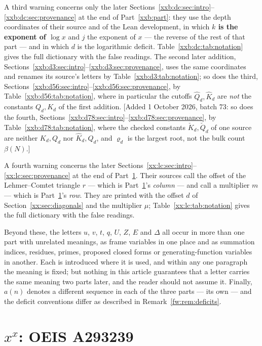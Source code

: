 \documentclass[11pt,a4paper]{article}
\numberwithin{equation}{section}
\theoremstyle{definition}
\theoremstyle{remark}
\theoremstyle{plain}
\begin{document}
\noindent
A third warning concerns only the later
Sections~\ref{xxb:dc:sec:intro}--\ref{xxb:dc:sec:provenance} at the end of
Part~\ref{xxb:part}: they use the depth coordinates of their source and of the
Lean development, in which \textbf{$k$ is the exponent of $\log x$} and $j$ the
exponent of $x$ --- the reverse of the rest of that part --- and in which $d$
is the logarithmic deficit.  Table~\ref{xxb:dc:tab:notation} gives the full
dictionary with the false readings.  The second later addition,
Sections~\ref{xxb:d3:sec:intro}--\ref{xxb:d3:sec:provenance}, uses the same
coordinates and renames its source's letters by
Table~\ref{xxb:d3:tab:notation}; so does the third,
Sections~\ref{xxb:d56:sec:intro}--\ref{xxb:d56:sec:provenance}, by
Table~\ref{xxb:d56:tab:notation}, where in particular the cutoffs
$\widehat Q_d,\widehat K_d$ are \emph{not} the constants $Q_d,K_d$ of the first
addition.  [Added 1 October 2026, batch 73: so does the fourth,
Sections~\ref{xxb:d78:sec:intro}--\ref{xxb:d78:sec:provenance}, by
Table~\ref{xxb:d78:tab:notation}, where the checked constants
$\check K_d,\check Q_d$ of one source are neither $K_d,Q_d$ nor
$\widehat K_d,\widehat Q_d$, and $\varrho_d$ is the largest root, not the bulk
count $\beta(N)$.]

\noindent
A fourth warning concerns the later
Sections~\ref{xx:lc:sec:intro}--\ref{xx:lc:sec:provenance} at the end of
Part~\ref{xx:part}.  Their sources call the offset of the Lehmer--Comtet
triangle $r$ --- which is Part~\ref{xx:part}'s \emph{column} --- and call a
multiplier $m$ --- which is Part~\ref{xx:part}'s \emph{row}.  They are printed
with the offset $d$ of Section~\ref{xx:sec:diagonals} and the multiplier $\mu$;
Table~\ref{xx:lc:tab:notation} gives the full dictionary with the false
readings.

\noindent
Beyond these, the letters $u$, $v$, $t$, $q$, $U$, $Z$, $E$ and $\Delta$ all
occur in more than one part with unrelated meanings, as frame variables in one
place and as summation indices, residues, primes, proposed closed forms or
generating-function variables in another.  Each is introduced where it is used,
and within any one paragraph the meaning is fixed; but nothing in this article
guarantees that a letter carries the same meaning two parts later, and the
reader should not assume it.  Finally, $a(n)$ denotes a different sequence in
each of the three parts --- its own --- and the deficit conventions differ as
described in Remark~\ref{fw:rem:deficits}.

\clearpage
\section{\texorpdfstring{$x^x$}{x^x}: OEIS A293239}\label{xx:part}
\end{document}
